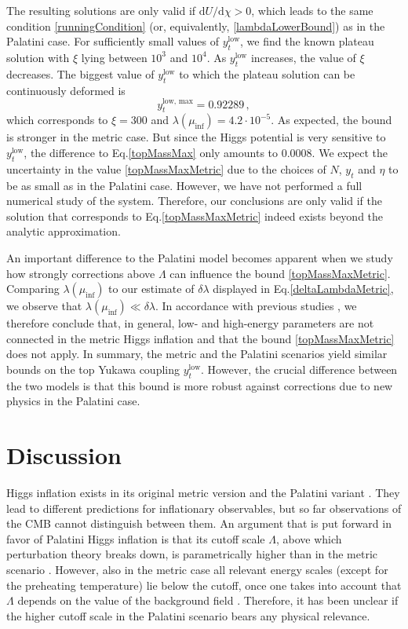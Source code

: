 \documentclass[a4paper,11pt]{article}
\makeatletter
\newcommand*{\Eq}{Eq.\@\xspace}
\newcommand*\diff{\mathrm{d}} %
\makeatother
\begin{document}
The resulting solutions are only valid if $\diff U/\diff \chi>0$, which leads to the same condition \eqref{runningCondition} (or, equivalently, \eqref{lambdaLowerBound}) as in the Palatini case.
For sufficiently small values of $y_t^{\text{low}}$, we find the known plateau solution with $\xi$ lying between $10^3$ and $10^4$. As $y_t^{\text{low}}$ increases, the value of $\xi$ decreases. The biggest value of $y_t^{\text{low}}$ to which the plateau solution can be continuously deformed is
\begin{equation}\label{topMassMaxMetric}
y_t^{\text{low, max}} = 0.92289 \,,
\end{equation}
which corresponds to $\xi = 300$ and $\lambda(\mu_{\text{inf}}) = 4.2\cdot 10^{-5}$.
As expected, the bound is stronger in the metric case. But since the Higgs potential is very sensitive to $y_t^{\text{low}}$, the difference to \Eq \eqref{topMassMax} only amounts to $0.0008$. We expect the uncertainty in the value \eqref{topMassMaxMetric} due to the choices of $N$, $y_t$ and $\eta$ to be as small as in the Palatini case. However, we have not performed a full numerical study of the system. Therefore, our conclusions are only valid if the solution that corresponds to \Eq \eqref{topMassMaxMetric} indeed exists beyond the analytic approximation. 

An important difference to the Palatini model becomes apparent when we study how strongly corrections above $\Lambda$ can influence the bound \eqref{topMassMaxMetric}. Comparing $\lambda(\mu_{\text{inf}})$ to our estimate of $\delta \lambda$ displayed in \Eq \eqref{deltaLambdaMetric}, we observe that $\lambda(\mu_{\text{inf}})\ll \delta \lambda$. In accordance with previous studies \cite{1008.5157, 1403.6078, 1412.3811}, we therefore conclude that, in general, low- and high-energy parameters are not connected in the metric Higgs inflation and that the bound \eqref{topMassMaxMetric} does not apply. In summary, the metric and the Palatini scenarios yield similar bounds on the top Yukawa coupling $y_t^{\text{low}}$. However, the crucial difference between the two models is that this bound is more robust against corrections due to new physics in the Palatini case.


\section{Discussion}
\label{sec:conclusion}
Higgs inflation exists in its original metric version \cite{0710.3755} and the Palatini variant \cite{0803.2664}. They lead to different predictions for inflationary observables, but so far observations of the CMB cannot distinguish between them. An argument that is put forward in favor of Palatini Higgs inflation is that its cutoff scale $\Lambda$, above which perturbation theory breaks down, is parametrically higher than in the metric scenario \cite{1012.2900}. However, also in the metric case all relevant energy scales (except for the preheating temperature) lie below the cutoff, once one takes into account that $\Lambda$ depends on the value of the background field \cite{1008.5157}. Therefore, it has been unclear if the higher cutoff scale in the Palatini scenario bears any physical relevance.
\end{document}
